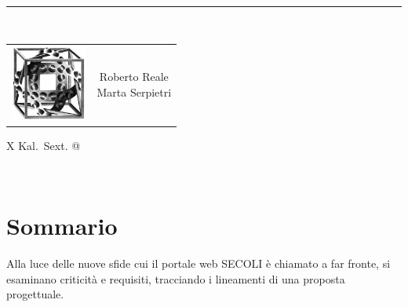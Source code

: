 \documentclass[headinclude,footinclude,a4paper,11pt,final]{scrreprt}
\makeatletter
\newcommand*{\rom}[1]{\expandafter\@slowromancap\romannumeral #1@}
\makeatother
\begin{document}

\begin{titlepage}

\null\vfill

\begin{center}
\large
\sffamily
\bigskip
\bigskip
{\Huge\spacedlowsmallcaps{\myTitle} \\
}

\bigskip
\rule{2cm}{0.4pt}
\bigskip
\bigskip

{\LARGE\spacedlowsmallcaps{\mySubTitle} \\
}

\bigskip
    
\vspace{8cm}

\begin{tabular}{cc}
	\parbox{0.3\textwidth}{\includegraphics[width=2.5cm]{cube-with-magic-ribbons.pdf}}
	&
	\parbox{0.7\textwidth}{{\Large{}} \\ 
	{\normalsize
	Roberto Reale \\
	Marta Serpietri \\
	\\
	}}
\end{tabular}

\vfill
X Kal.~Sext. \rom{2013}
\end{center}
\end{titlepage}



\begingroup
\let\clearpage\relax
~
\vfill
\vfill

\chapter*{Sommario}

Alla luce delle nuove sfide cui il portale web SECOLI è chiamato a far fronte, si esaminano criticità e requisiti, tracciando i lineamenti di una proposta progettuale.
\end{document}
